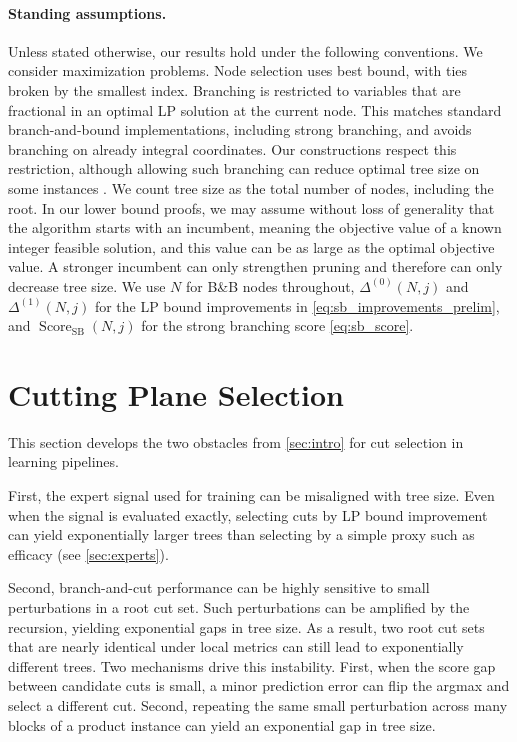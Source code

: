 \documentclass[smallextended,envcountsect]{svjour3} %
\newcommand{\0}{\mathbf{0}}
\DeclareMathOperator{\Score}{Score} %
\newcommand{\1}{\mathbf{1}} %
\begin{document}
\paragraph{Standing assumptions.}\label{para:convention}
Unless stated otherwise, our results hold under the following conventions.
We consider maximization problems.
Node selection uses best bound, with ties broken by the smallest index.
Branching is restricted to variables that are fractional in an optimal LP solution at the current node.
This matches standard branch-and-bound implementations, including strong branching, and avoids branching on already integral coordinates.
Our constructions respect this restriction, %
	although allowing such branching can reduce optimal tree size on some instances \citep{dey2024theoretical}.
	We count tree size as the total number of nodes, including the root.
	In our lower bound proofs, we may assume without loss of generality that the algorithm starts with an incumbent, meaning the objective value of a known integer feasible solution, and this value can be as large as the optimal objective value.
	A stronger incumbent can only strengthen pruning and therefore can only decrease tree size.
	We use $N$ for B\&B nodes throughout, $\Delta^{(0)}(N,j)$ and $\Delta^{(1)}(N,j)$ for the LP bound improvements in \eqref{eq:sb_improvements_prelim}, and $\Score_{\mathrm{SB}}(N,j)$ for the strong branching score \eqref{eq:sb_score}.

\section{Cutting Plane Selection} \label{sec:cutting}

This section develops the two obstacles from \cref{sec:intro} for cut selection in learning pipelines.

First, the expert signal used for training can be misaligned with tree size. Even when the signal is evaluated exactly, selecting cuts by LP bound improvement can yield exponentially larger trees than selecting by a simple proxy such as efficacy (see \cref{sec:experts}).

Second, branch-and-cut performance can be highly sensitive to small perturbations in a root cut set. Such perturbations can be amplified by the recursion, yielding exponential gaps in tree size. As a result, two root cut sets that are nearly identical under local metrics can still lead to exponentially different trees.
Two mechanisms drive this instability. First, when the score gap between candidate cuts is small, a minor prediction error can flip the argmax and select a different cut.
Second, repeating the same small perturbation across many blocks of a product instance can yield an exponential gap in tree size.
\end{document}
